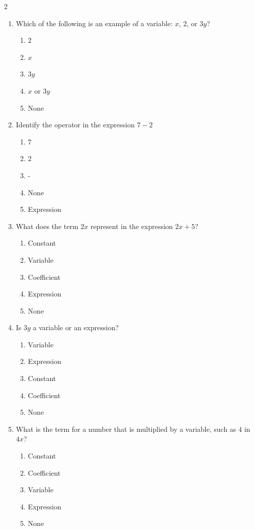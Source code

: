 \documentclass[10pt]{article}
\begin{document}
\begin{multicols}{2}
\begin{enumerate}[label=\textbf{Q\arabic*.}, leftmargin=*, itemsep=6pt, parsep=0pt]
  \item \small Which of the following is an example of a variable: $x$, $2$, or $3y$?
  \begin{enumerate}[label=(\Alph*), leftmargin=0.6cm, nosep, itemsep=2pt]
    \item 2
    \item $x$
    \item $3y$
    \item $x$ or $3y$
    \item None
  \end{enumerate}

  \item \small Identify the operator in the expression $7 - 2$
  \begin{enumerate}[label=(\Alph*), leftmargin=0.6cm, nosep, itemsep=2pt]
    \item 7
    \item 2
    \item -
    \item None
    \item Expression
  \end{enumerate}

  \item \small What does the term $2x$ represent in the expression $2x + 5$?
  \begin{enumerate}[label=(\Alph*), leftmargin=0.6cm, nosep, itemsep=2pt]
    \item Constant
    \item Variable
    \item Coefficient
    \item Expression
    \item None
  \end{enumerate}

  \item \small Is $3y$ a variable or an expression?
  \begin{enumerate}[label=(\Alph*), leftmargin=0.6cm, nosep, itemsep=2pt]
    \item Variable
    \item Expression
    \item Constant
    \item Coefficient
    \item None
  \end{enumerate}

  \item \small What is the term for a number that is multiplied by a variable, such as $4$ in $4x$?
  \begin{enumerate}[label=(\Alph*), leftmargin=0.6cm, nosep, itemsep=2pt]
    \item Constant
    \item Coefficient
    \item Variable
    \item Expression
    \item None
  \end{enumerate}

\end{enumerate}
\end{multicols}
\end{document}
